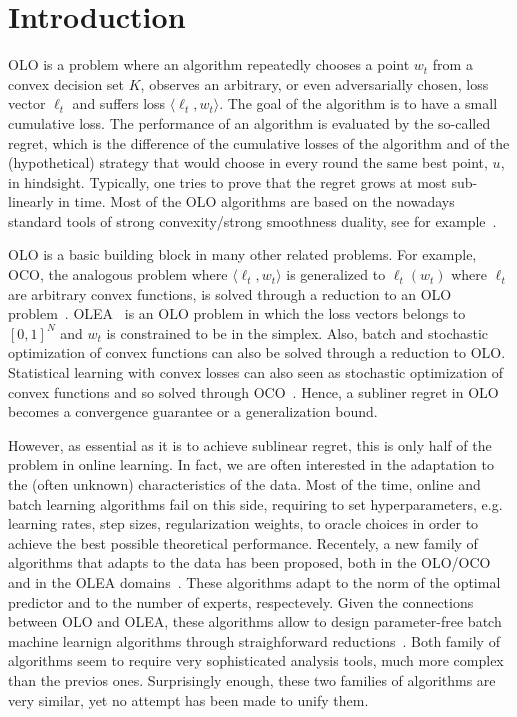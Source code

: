 \section{Introduction}
\label{section:introduction}

\ac{OLO} is a problem where an algorithm repeatedly chooses a point $w_t$ from a
convex decision set $K$, observes an arbitrary, or even adversarially chosen,
loss vector $\ell_t$ and suffers loss $\langle \ell_t, w_t \rangle$. The goal of
the algorithm is to have a small cumulative loss. The performance of an
algorithm is evaluated by the so-called regret, which is the difference of the
cumulative losses of the algorithm and of the (hypothetical) strategy that would
choose in every round the same best point, $u$, in hindsight. Typically, one
tries to prove that the regret grows at most sub-linearly in time. Most of the
\ac{OLO} algorithms are based on the nowadays standard tools of strong
convexity/strong smoothness duality, see for example~\citet{OrabonaCCB15}.

\ac{OLO} is a basic building block in many other related problems. For example,
\ac{OCO}, the analogous problem where $\langle \ell_t, w_t \rangle$ is
generalized to $\ell_t(w_t)$ where $\ell_t$ are arbitrary convex functions, is
solved through a reduction to an \ac{OLO}
problem~\citep{Cesa-BianchiL06,Shalev-Shwartz12}.
\ac{OLEA}~\citep{LittlestoneW94,Vovk98,Cesa-BianchiFHHSW97} is an \ac{OLO}
problem in which the loss vectors belongs to $[0,1]^N$ and $w_t$ is constrained
to be in the simplex. Also, batch and stochastic optimization of convex
functions can also be solved through a reduction to \ac{OLO}. Statistical
learning with convex losses can also seen as stochastic optimization of convex
functions and so solved through \ac{OCO}~\citep{Munro1951}. Hence, a subliner
regret in \ac{OLO} becomes a convergence guarantee or a generalization bound.

However, as essential as it is to achieve sublinear regret, this is only half of
the problem in online learning. In fact, we are often interested in the
adaptation to the (often unknown) characteristics of the data. Most of the time,
online and batch learning algorithms fail on this side, requiring to set
hyperparameters, e.g. learning rates, step sizes, regularization weights, to
oracle choices in order to achieve the best possible theoretical performance.
Recentely, a new family of algorithms that adapts to the data has been proposed,
both in the
\ac{OLO}/\ac{OCO}~\citep{StreeterM12,Orabona13,McMahanA13,McMahanO14,Orabona14}
and in the \ac{OLEA}
domains~\citep{ChaudhuriYH09,ChernovV10,LuoE14,LuoS15,KoolenE15}. These
algorithms adapt to the norm of the optimal predictor and to the number of
experts, respectevely. Given the connections between \ac{OLO} and \ac{OLEA},
these algorithms allow to design parameter-free batch machine learnign
algorithms through straighforward reductions~\citep{Orabona14,LuoS15}. Both
family of algorithms seem to require very sophisticated analysis tools, much
more complex than the previos ones. Surprisingly enough, these two families of
algorithms are very similar, yet no attempt has been made to unify them.

